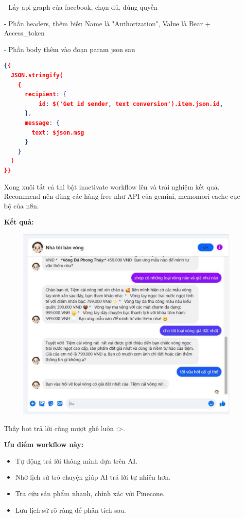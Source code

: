 - Lấy api graph của facebook, chọn đủ, đúng quyền

- Phần headers, thêm biến Name là "Authorization", Value là Bear + Access\_token

- Phần body thêm vào đoạn param json sau

\begin{lstlisting}[language = Json]
{{ 
  JSON.stringify(
    {
      recipient: { 
          id: $('Get id sender, text conversion').item.json.id,
      },
      message: {
        text: $json.msg
      }
    }
  )
}}
\end{lstlisting}

Xong xuôi tất cả thì bật inactivate workflow lên và trải nghiệm kết quả. Recommend nên dùng các hàng free như API của gemini, memomori cache cục bộ của n8n. 

\textbf{Kết quả: }

\begin{figure}[htbp]
    \centering
    \includegraphics[width=1\linewidth]{Chap1-7/result-mess.pdf}
\end{figure}

Thấy bot trả lời cũng mượt ghê luôn :>.

\textbf{Ưu điểm workflow này:}

\begin{itemize}
    \item Tự động trả lời thông minh dựa trên AI.

    \item Nhớ lịch sử trò chuyện giúp AI trả lời tự nhiên hơn.

    \item Tra cứu sản phẩm nhanh, chính xác với Pinecone.

    \item Lưu lịch sử rõ ràng để phân tích sau.
\end{itemize}

